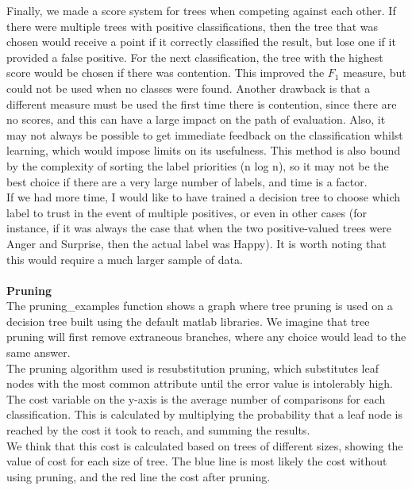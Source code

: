 \documentclass[12pt]{article}
\begin{document}
Finally, we made a score system for trees when competing against each other. If there were multiple trees with positive classifications, then the tree that was chosen would receive a point if it correctly classified the result, but lose one if it provided a false positive. For the next classification, the tree with the highest score would be chosen if there was contention. This improved the \( F_1 \) measure, but could not be used when no classes were found. Another drawback is that a different measure must be used the first time there is contention, since there are no scores, and this can have a large impact on the path of evaluation. Also, it may not always be possible to get immediate feedback on the classification whilst learning, which would impose limits on its usefulness. This method is also bound by the complexity of sorting the label priorities (n log n), so it may not be the best choice if there are a very large number of labels, and time is a factor. \\

If we had more time, I would like to have trained a decision tree to choose which label to trust in the event of multiple positives, or even in other cases (for instance, if it was always the case that when the two positive-valued trees were Anger and Surprise, then the actual label was Happy). It is worth noting that this would require a much larger sample of data. \\ \\

{\bf Pruning} \\

The pruning\_examples function shows a graph where tree pruning is used on a decision tree built using the default matlab libraries. We imagine that tree pruning will first remove extraneous branches, where any choice would lead to the same answer. \\

The pruning algorithm used is resubstitution pruning, which substitutes leaf nodes with the most common attribute until the error value is intolerably high. \\

The cost variable on the y-axis is the average number of comparisons for each classification. This is calculated by multiplying the probability that a leaf node is reached by the cost it took to reach, and summing the results. \\

We think that this cost is calculated based on trees of different sizes, showing the value of cost for each size of tree. The blue line is most likely the cost without using pruning, and the red line the cost after pruning. \\
\end{document}
